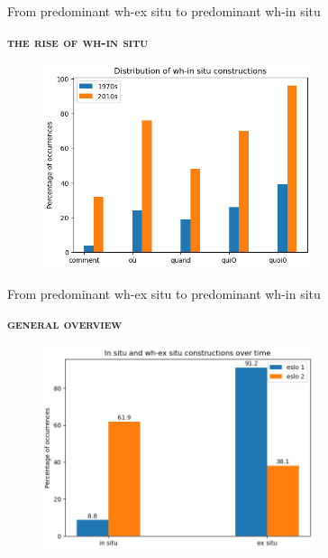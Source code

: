 \documentclass[lesson_slides]{subfiles}
\begin{document}
\begin{frame}[c]{From predominant wh-ex situ to predominant wh-in situ}


    \textbf{\textsc{the rise of wh-in situ}}
    \begin{center}
        \includegraphics[width=10cm, height=6cm]{images/insitub.png}
    \end{center}
  
\end{frame}
\begin{frame}[c]{From predominant wh-ex situ to predominant wh-in situ}

    \textbf{\textsc{general overview}} \pause
    \begin{center}
        \includegraphics[width=10cm, height=6cm]{images/exsituinsituperc.png}
    \end{center}
  
\end{frame}
\end{document}
